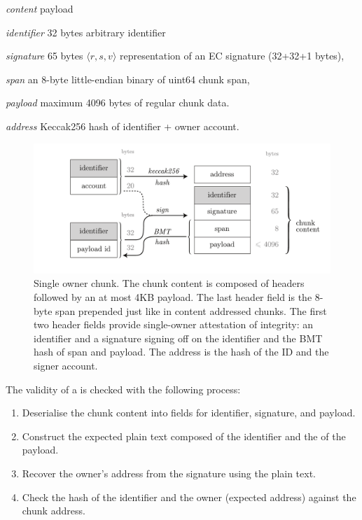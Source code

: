 \begin{labelledlist}
    \item[\emph{content}] payload
\begin{labelledlist}
    \item[\emph{identifier}] 32 bytes arbitrary identifier
    \item[\emph{signature}] 65 bytes $\langle r,s,v \rangle$ representation of an EC signature (32+32+1 bytes),
    \item[\emph{span}] an 8-byte little-endian binary of uint64 chunk span,
    \item[\emph{payload}] maximum 4096 bytes of regular chunk data.
\end{labelledlist}
    \item[\emph{address}] Keccak256 hash of identifier + owner account.
\end{labelledlist}

\begin{figure}[htbp]
   \centering
   \includegraphics[width=\textwidth]{fig/single-owner-chunk.pdf}
   \caption[Single owner chunk\statusgreen]{Single owner chunk. The chunk content is composed of headers followed by an at most 4KB payload. The last header field is the 8-byte span prepended just like in content addressed chunks. The first two header fields provide single-owner attestation of integrity: an identifier and a signature signing off on the identifier and the BMT hash of span and payload. The address is the hash of the ID and the signer account.}
   \label{fig:single-owner-chunks}
\end{figure}

The validity of a  is checked with the following process:

\begin{enumerate}
    \item Deserialise the chunk content into fields for identifier, signature, and payload.
    \item Construct the expected plain text composed of the identifier and the  of the payload.
    \item Recover the owner's address from the signature using the plain text.
    \item Check the hash of the identifier and the owner (expected address) against the chunk address.
\end{enumerate}

